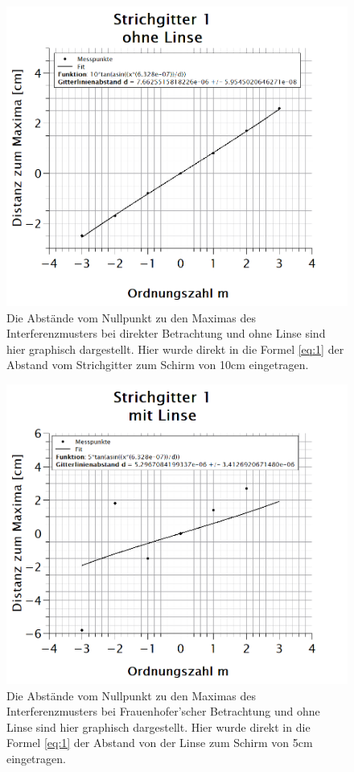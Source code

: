\begin{figure}[h]
\includegraphics[width=\textwidth]{Bilder/strichgitter1_ohneLinse.png} 
\caption[Strichgitter 1: ohne Linse]{Die Abstände vom Nullpunkt zu den Maximas des Interferenzmusters bei direkter Betrachtung und ohne Linse sind hier graphisch dargestellt. Hier wurde direkt in die Formel \ref{eq:1} der Abstand vom Strichgitter zum Schirm von 10cm eingetragen.}
\label{fig:strichgitter1_ohneLinse}
\end{figure}
\newpage
\begin{figure}[h]
\includegraphics[width=\textwidth]{Bilder/strichgitter1_mitLinse.png} 
\caption[Strichgitter 1: mit Linse]{Die Abstände vom Nullpunkt zu den Maximas des Interferenzmusters bei Frauenhofer'scher Betrachtung und ohne Linse sind hier graphisch dargestellt. Hier wurde direkt in die Formel \ref{eq:1} der Abstand von der Linse zum Schirm von 5cm eingetragen.}
\label{fig:strichgitter1_mitLinse}
\end{figure}
\newpage

